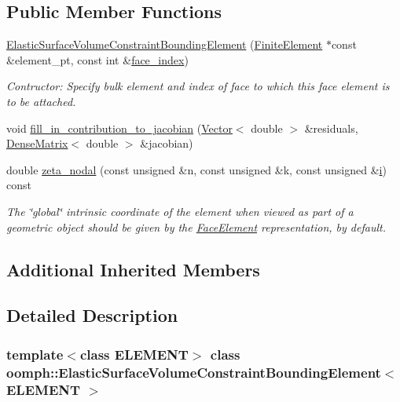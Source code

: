 \subsection*{Public Member Functions}
\begin{DoxyCompactItemize}
\item 
\hyperlink{classoomph_1_1ElasticSurfaceVolumeConstraintBoundingElement_a22e5cb7f3cb0d363301ae8ef232dd6cb}{Elastic\+Surface\+Volume\+Constraint\+Bounding\+Element} (\hyperlink{classoomph_1_1FiniteElement}{Finite\+Element} $\ast$const \&element\+\_\+pt, const int \&\hyperlink{classoomph_1_1FaceElement_a478d577ac6db67ecc80f1f02ae3ab170}{face\+\_\+index})
\begin{DoxyCompactList}\small\item\em Contructor\+: Specify bulk element and index of face to which this face element is to be attached. \end{DoxyCompactList}\item 
void \hyperlink{classoomph_1_1ElasticSurfaceVolumeConstraintBoundingElement_a16addc228d9871f22cd9eaf9b581ff5c}{fill\+\_\+in\+\_\+contribution\+\_\+to\+\_\+jacobian} (\hyperlink{classoomph_1_1Vector}{Vector}$<$ double $>$ \&residuals, \hyperlink{classoomph_1_1DenseMatrix}{Dense\+Matrix}$<$ double $>$ \&jacobian)
\item 
double \hyperlink{classoomph_1_1ElasticSurfaceVolumeConstraintBoundingElement_ab9826b68e1931ed4eafdf20af0bf070d}{zeta\+\_\+nodal} (const unsigned \&n, const unsigned \&k, const unsigned \&\hyperlink{cfortran_8h_adb50e893b86b3e55e751a42eab3cba82}{i}) const
\begin{DoxyCompactList}\small\item\em The \char`\"{}global\char`\"{} intrinsic coordinate of the element when viewed as part of a geometric object should be given by the \hyperlink{classoomph_1_1FaceElement}{Face\+Element} representation, by default. \end{DoxyCompactList}\end{DoxyCompactItemize}
\subsection*{Additional Inherited Members}


\subsection{Detailed Description}
\subsubsection*{template$<$class E\+L\+E\+M\+E\+NT$>$\newline
class oomph\+::\+Elastic\+Surface\+Volume\+Constraint\+Bounding\+Element$<$ E\+L\+E\+M\+E\+N\+T $>$}

